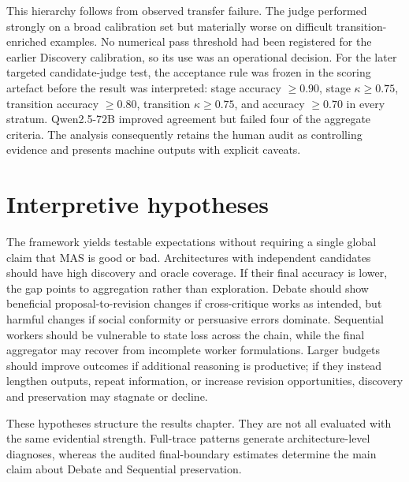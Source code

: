 This hierarchy follows from observed transfer failure. The judge performed strongly on a broad calibration set but materially worse on difficult transition-enriched examples. No numerical pass threshold had been registered for the earlier Discovery calibration, so its use was an operational decision. For the later targeted candidate-judge test, the acceptance rule was frozen in the scoring artefact before the result was interpreted: stage accuracy $\geq0.90$, stage $\kappa\geq0.75$, transition accuracy $\geq0.80$, transition $\kappa\geq0.75$, and accuracy $\geq0.70$ in every stratum. Qwen2.5-72B improved agreement but failed four of the aggregate criteria. The analysis consequently retains the human audit as controlling evidence and presents machine outputs with explicit caveats.

\section{Interpretive hypotheses}

The framework yields testable expectations without requiring a single global claim that MAS is good or bad. Architectures with independent candidates should have high discovery and oracle coverage. If their final accuracy is lower, the gap points to aggregation rather than exploration. Debate should show beneficial proposal-to-revision changes if cross-critique works as intended, but harmful changes if social conformity or persuasive errors dominate. Sequential workers should be vulnerable to state loss across the chain, while the final aggregator may recover from incomplete worker formulations. Larger budgets should improve outcomes if additional reasoning is productive; if they instead lengthen outputs, repeat information, or increase revision opportunities, discovery and preservation may stagnate or decline.

These hypotheses structure the results chapter. They are not all evaluated with the same evidential strength. Full-trace patterns generate architecture-level diagnoses, whereas the audited final-boundary estimates determine the main claim about Debate and Sequential preservation.

